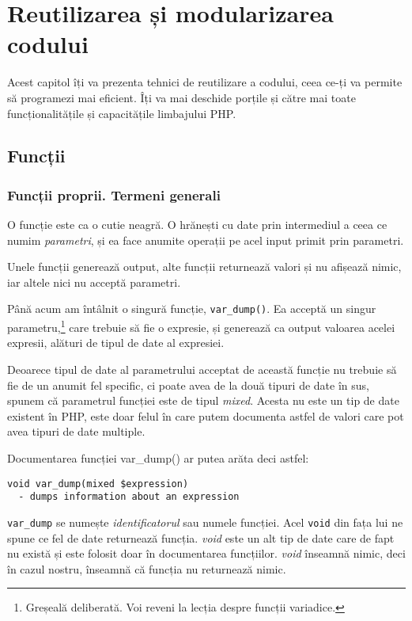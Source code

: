 \chapter{Reutilizarea și modularizarea codului}

\begin{chapsummary}
Acest capitol îți va prezenta tehnici de reutilizare a codului,
ceea ce-ți va permite să programezi mai eficient. Îți va
mai deschide porțile și către mai toate funcționalitățile
și capacitățile limbajului PHP.
\end{chapsummary}

\section{Funcții}
\subsection{Funcții proprii. Termeni generali}
O funcție este ca o cutie neagră. O hrănești cu date prin
intermediul a ceea ce numim \textsl{parametri}, și ea
face anumite operații pe acel input primit prin parametri.

Unele funcții generează output, alte funcții returnează
valori și nu afișează nimic, iar altele nici nu acceptă
parametri.

Până acum am întâlnit o singură funcție, \texttt{var\_dump()}.
Ea acceptă un singur parametru,\footnote{Greșeală deliberată.
Voi reveni la lecția despre funcții variadice.} care trebuie să fie o expresie,
și generează ca output valoarea acelei expresii, alături de tipul
de date al expresiei.

Deoarece tipul de date al parametrului acceptat de această funcție
nu trebuie să fie de un anumit fel specific, ci poate avea 
de la două tipuri de date în sus,
spunem că parametrul funcției este de tipul \textsl{mixed}.
Acesta nu este un tip de date existent în PHP, este doar
felul în care putem documenta astfel de valori care pot
avea tipuri de date multiple.

Documentarea funcției var\_dump() ar putea arăta deci astfel:

\begin{verbatim}
void var_dump(mixed $expression)
  - dumps information about an expression
\end{verbatim}

\texttt{var\_dump} se numește \textsl{identificatorul} sau numele funcției.
Acel \texttt{void} din fața lui ne spune ce fel de date returnează funcția. \textsl{void}
este un alt tip de date care de fapt nu există și este folosit doar în documentarea
funcțiilor. \textit{void} înseamnă nimic, deci în cazul nostru, înseamnă că
funcția nu returnează nimic.

